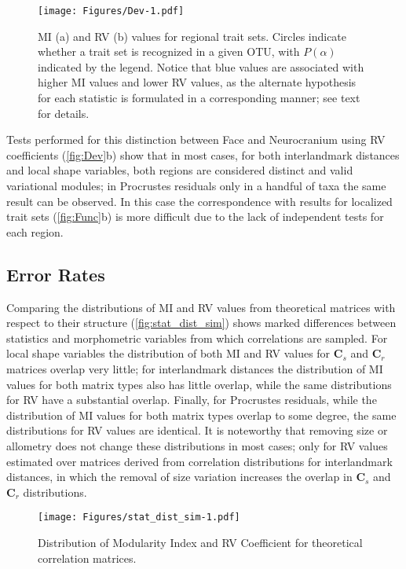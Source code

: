 \documentclass[12pt,]{article}
\begin{document}
\begin{figure}[htbp]
\centering
\texttt{[image: Figures/Dev-1.pdf]}
\caption{MI (a) and RV (b) values for regional trait sets. Circles
indicate whether a trait set is recognized in a given OTU, with
$P(\alpha)$ indicated by the legend. Notice that blue values are
associated with higher MI values and lower RV values, as the alternate
hypothesis for each statistic is formulated in a corresponding manner;
see text for details. \label{fig:Dev}}
\end{figure}

Tests performed for this distinction between Face and Neurocranium using
RV coefficients (\autoref{fig:Dev}b) show that in most cases, for both
interlandmark distances and local shape variables, both regions are
considered distinct and valid variational modules; in Procrustes
residuals only in a handful of taxa the same result can be observed. In
this case the correspondence with results for localized trait sets
(\autoref{fig:Func}b) is more difficult due to the lack of independent
tests for each region.

\subsection{Error Rates}\label{error-rates}

Comparing the distributions of MI and RV values from theoretical
matrices with respect to their structure (\autoref{fig:stat_dist_sim})
shows marked differences between statistics and morphometric variables
from which correlations are sampled. For local shape variables the
distribution of both MI and RV values for $\mathbf{C}_s$ and
$\mathbf{C}_r$ matrices overlap very little; for interlandmark distances
the distribution of MI values for both matrix types also has little
overlap, while the same distributions for RV have a substantial overlap.
Finally, for Procrustes residuals, while the distribution of MI values
for both matrix types overlap to some degree, the same distributions for
RV values are identical. It is noteworthy that removing size or
allometry does not change these distributions in most cases; only for RV
values estimated over matrices derived from correlation distributions
for interlandmark distances, in which the removal of size variation
increases the overlap in $\mathbf{C}_s$ and $\mathbf{C}_r$
distributions.

\begin{figure}[htbp]
\centering
\texttt{[image: Figures/stat\_dist\_sim-1.pdf]}
\caption{Distribution of Modularity Index and RV Coefficient for
theoretical correlation matrices. \label{fig:stat_dist_sim}}
\end{figure}
\end{document}
